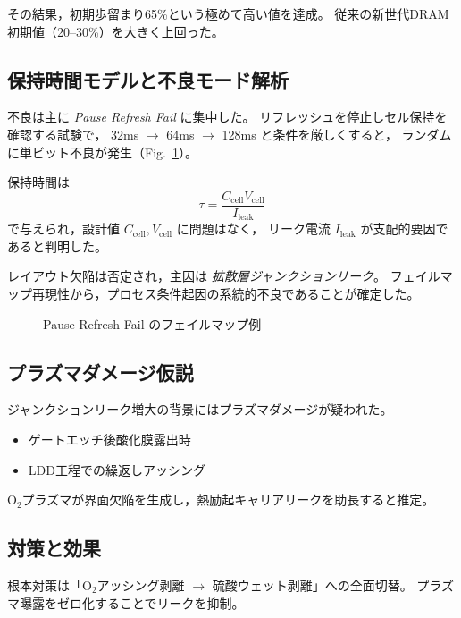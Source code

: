 \documentclass[conference]{IEEEtran}
\begin{document}
その結果，初期歩留まり65\%という極めて高い値を達成。
従来の新世代DRAM初期値（20--30\%）を大きく上回った。

\subsection{保持時間モデルと不良モード解析}
不良は主に \emph{Pause Refresh Fail} に集中した。
リフレッシュを停止しセル保持を確認する試験で，
32ms $\rightarrow$ 64ms $\rightarrow$ 128ms と条件を厳しくすると，
ランダムに単ビット不良が発生（Fig.~\ref{fig:failmap}）。

保持時間は
\[
\tau = \frac{C_{\mathrm{cell}} V_{\mathrm{cell}}}{I_{\mathrm{leak}}}
\]
で与えられ，設計値 $C_{\mathrm{cell}}, V_{\mathrm{cell}}$ に問題はなく，
リーク電流 $I_{\mathrm{leak}}$ が支配的要因であると判明した。

レイアウト欠陥は否定され，主因は \emph{拡散層ジャンクションリーク}。
フェイルマップ再現性から，プロセス条件起因の系統的不良であることが確定した。

\begin{figure}[t]
\centering
{}
\caption{Pause Refresh Fail のフェイルマップ例}
\label{fig:failmap}
\end{figure}

\subsection{プラズマダメージ仮説}
ジャンクションリーク増大の背景にはプラズマダメージが疑われた。
\begin{itemize}
  \item ゲートエッチ後酸化膜露出時
  \item LDD工程での繰返しアッシング
\end{itemize}
O$_2$プラズマが界面欠陥を生成し，熱励起キャリアリークを助長すると推定。

\subsection{対策と効果}
根本対策は「O$_2$アッシング剥離 $\rightarrow$ 硫酸ウェット剥離」への全面切替。
プラズマ曝露をゼロ化することでリークを抑制。
\end{document}

